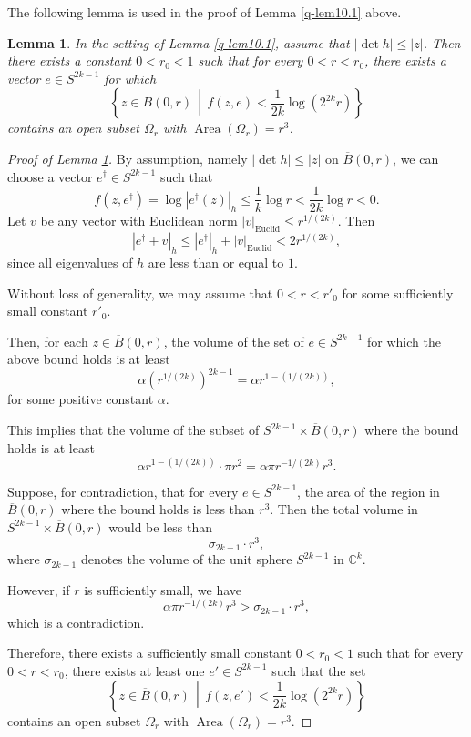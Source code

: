 \documentclass[12pt,twoside]{amsart}
\DeclareMathOperator{\Area}{Area}
\newtheorem{lem}[thm]{Lemma}
\theoremstyle{definition}
\begin{document}
The following lemma is used in the proof of Lemma \ref{q-lem10.1} above.

\begin{lem}\label{q-lem10.7} 
In the setting of Lemma \ref{q-lem10.1}, assume that 
$|\det h| \leq |z|$. 
Then there exists a constant $0 < r_0 < 1$ such that for every $0 < r < r_0$, there exists a vector $e \in S^{2k-1}$ for which 
\[
\left\{ z \in \overline{B}(0, r) \,\middle|\, f(z, e) < \frac{1}{2k} \log (2^{2k} r) \right\}
\]
contains an open subset $\Omega_r$ with $\Area(\Omega_r) = r^3$.
\end{lem}

\begin{proof}[Proof of Lemma \ref{q-lem10.7}]
By assumption, namely $|\det h| \leq |z|$ on $\overline{B}(0, r)$, we can choose a vector $e^\dag \in S^{2k-1}$ such that
\[
f(z, e^\dag) = \log |e^\dag(z)|_h \leq \frac{1}{k} \log r < \frac{1}{2k} \log r < 0.
\]
Let $v$ be any vector with Euclidean norm $|v|_{\mathrm{Euclid}} \leq r^{1/(2k)}$. Then
\[
|e^\dag + v|_h \leq |e^\dag|_h + |v|_{\mathrm{Euclid}} < 2 r^{1/(2k)},
\]
since all eigenvalues of $h$ are less than or equal to $1$.

Without loss of generality, we may assume that $0 < r < r'_0$ 
for some sufficiently small constant $r'_0$.

Then, for each $z \in \overline{B}(0, r)$, the volume of the set of $e \in S^{2k-1}$ for which the above bound holds is at least
\[
\alpha \left(r^{1/(2k)}\right)^{2k-1} = \alpha r^{1 - (1/(2k))},
\]
for some positive constant $\alpha$.

This implies that the volume of the subset of $S^{2k-1} \times \overline{B}(0, r)$ where the bound holds is at least
\[
\alpha r^{1 - (1/(2k))} \cdot \pi r^2 = \alpha \pi r^{-1/(2k)} r^3.
\]

Suppose, for contradiction, that for every $e \in S^{2k-1}$, 
the area of the region in $\overline{B}(0, r)$ where the 
bound holds is less than $r^3$. Then the total volume 
in $S^{2k-1} \times \overline{B}(0, r)$ would be less than
\[
\sigma_{2k-1} \cdot r^3,
\]
where $\sigma_{2k-1}$ denotes the volume of the unit sphere $S^{2k-1}$ in $\mathbb{C}^k$.

However, if $r$ is sufficiently small, we have
\[
\alpha \pi r^{-1/(2k)} r^3 > \sigma_{2k-1} \cdot r^3,
\]
which is a contradiction.

Therefore, there exists a sufficiently small constant $0 < r_0 < 1$ 
such that for every $0 < r < r_0$, there exists at 
least one $e' \in S^{2k-1}$ such that the set
\[
\left\{ z \in \overline{B}(0, r) \,\middle|\, f(z, e') < \frac{1}{2k} \log (2^{2k} r) \right\}
\]
contains an open subset $\Omega_r$ with $\Area(\Omega_r) = r^3$.
\end{proof}
\end{document}
